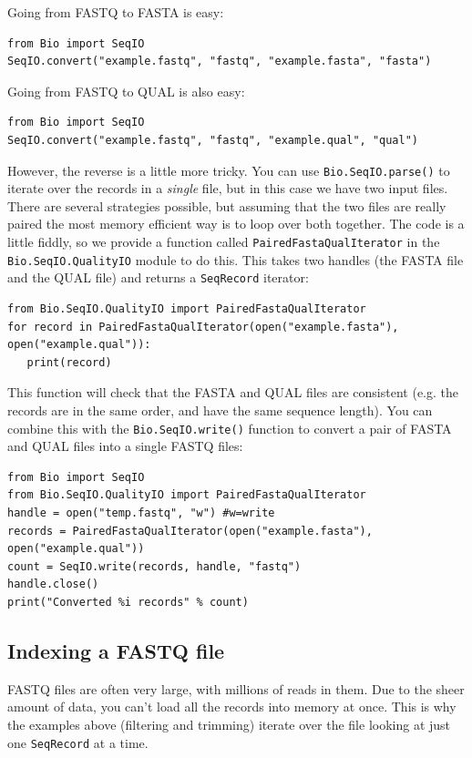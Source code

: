 \documentclass{report}
\begin{document}
Going from FASTQ to FASTA is easy:

\begin{verbatim}
from Bio import SeqIO
SeqIO.convert("example.fastq", "fastq", "example.fasta", "fasta")
\end{verbatim}

Going from FASTQ to QUAL is also easy:

\begin{verbatim}
from Bio import SeqIO
SeqIO.convert("example.fastq", "fastq", "example.qual", "qual")
\end{verbatim}

However, the reverse is a little more tricky. You can use \verb|Bio.SeqIO.parse()|
to iterate over the records in a \emph{single} file, but in this case we have
two input files. There are several strategies possible, but assuming that the
two files are really paired the most memory efficient way is to loop over both
together. The code is a little fiddly, so we provide a function called
\verb|PairedFastaQualIterator| in the \verb|Bio.SeqIO.QualityIO| module to do
this. This takes two handles (the FASTA file and the QUAL file) and returns
a \verb|SeqRecord| iterator:

\begin{verbatim}
from Bio.SeqIO.QualityIO import PairedFastaQualIterator
for record in PairedFastaQualIterator(open("example.fasta"), open("example.qual")):
   print(record)
\end{verbatim}

This function will check that the FASTA and QUAL files are consistent (e.g.
the records are in the same order, and have the same sequence length).
You can combine this with the \verb|Bio.SeqIO.write()| function to convert a
pair of FASTA and QUAL files into a single FASTQ files:

\begin{verbatim}
from Bio import SeqIO
from Bio.SeqIO.QualityIO import PairedFastaQualIterator
handle = open("temp.fastq", "w") #w=write
records = PairedFastaQualIterator(open("example.fasta"), open("example.qual"))
count = SeqIO.write(records, handle, "fastq")
handle.close()
print("Converted %i records" % count)
\end{verbatim}

\subsection{Indexing a FASTQ file}
\label{sec:fastq-indexing}

FASTQ files are often very large, with millions of reads in them. Due to the
sheer amount of data, you can't load all the records into memory at once.
This is why the examples above (filtering and trimming) iterate over the file
looking at just one \verb|SeqRecord| at a time.
\end{document}
